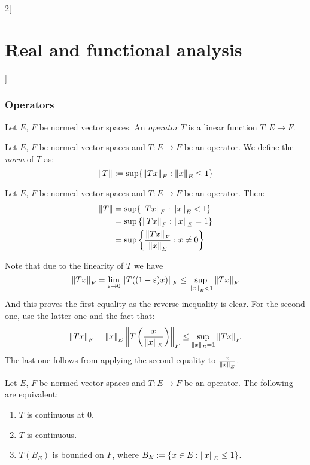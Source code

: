 \documentclass[../../../main_math.tex]{subfiles}
\begin{document}
\begin{multicols}{2}[\section{Real and functional analysis}]
  \subsubsection{Operators}
  \begin{definition}
    Let $E$, $F$ be normed vector spaces. An \emph{operator} $T$ is a linear function $T:E\rightarrow F$.
  \end{definition}
  \begin{definition}
    Let $E$, $F$ be normed vector spaces and $T:E\rightarrow F$ be an operator. We define the \emph{norm} of $T$ as:
    \begin{equation}\label{RFA:normoperator}
      \left\|T\right\|:=\sup\{\left\|Tx\right\|_F:\left\|x\right\|_E\leq 1\}
    \end{equation}
  \end{definition}
  \begin{lemma}\label{RFA:normT}
    Let $E$, $F$ be normed vector spaces and $T:E\rightarrow F$ be an operator. Then:
    \begin{align*}
      \left\|T\right\| & =\sup\{\left\|Tx\right\|_F:\left\|x\right\|_E< 1\}                        \\
               & =\sup\left\{\left\|Tx\right\|_F:\left\|x\right\|_E= 1\right\}             \\
               & =\sup\left\{\frac{\left\|Tx\right\|_F}{\left\|x\right\|_E}:x\ne 0\right\}
    \end{align*}
  \end{lemma}
  \begin{sproof}
    Note that due to the linearity of $T$ we have $$\left\|Tx\right\|_F=\lim_{\varepsilon \to 0}\left\|T((1-\varepsilon)x)\right\|_F\leq \sup_{\left\|x\right\|_E< 1}\left\|Tx\right\|_F$$
    And this proves the first equality as the reverse inequality is clear. For the second one, use the latter one and the fact that:
    $$\left\|Tx\right\|_F=\left\|x\right\|_E\left\|T\left(\frac{x}{\left\|x\right\|_E}\right)\right\|_F\leq \sup_{\left\|x\right\|_E= 1}\left\|Tx\right\|_F$$
    The last one follows from applying the second equality to $\frac{x}{\left\|x\right\|_E}$.
  \end{sproof}
  \begin{theorem}
    Let $E$, $F$ be normed vector spaces and $T:E\rightarrow F$ be an operator. The following are equivalent:
    \begin{enumerate}[ref = \arabic{enumi}]
      \item\label{RFA:TcontinuousA} $T$ is continuous at 0.
      \item\label{RFA:TcontinuousB} $T$ is continuous.
      \item\label{RFA:TcontinuousC} $T(B_E)$ is bounded on $F$, where $B_E:=\{x\in E:\left\|x\right\|_E\leq 1\}$.

\end{enumerate}
\end{theorem}
\end{multicols}
\end{document}
